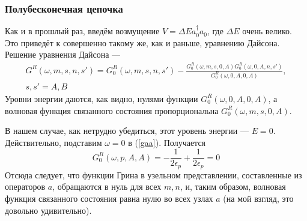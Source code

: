 \subsubsection{Полубесконечная цепочка}
Как и в прошлый раз, введём возмущение $V = \Delta E a_0^\dagger a_0$, где $\Delta E$ очень велико.
Это приведёт к совершенно такому же, как и раньше, уравнению Дайсона. Решение уравнения Дайсона ---
\begin{multline}
	G^R(\omega, m, s, n, s') = 
		G^R_0(\omega, m,s,n,s') - 
		\frac{G^R_0(\omega, m, s, 0, A)G^R_0(\omega, 0, A, n, s')}{G^R_0(\omega, 0, A, 0, A)},\\
		s,s' = A,B
\end{multline}
Уровни энергии даются, как видно, нулями функции $G^R_0(\omega, 0,A,0,A)$, а волновая функция
связанного состояния пропорциональна $G^R_0(\omega, m,s,0,A)$.

В нашем случае, как нетрудно убедиться, этот уровень энергии --- $E = 0$. Действительно, подставим 
$\omega = 0$ в (\ref{gaa}). Получается
\begin{equation}
	G^R_0 (\omega, p, A, A) = 
		-\frac{1}{2\epsilon_p} + 
					\frac{1}{2\epsilon_p} = 0
\end{equation}
Отсюда следует, что функции Грина в узельном представлении, 
составленные из операторов $a$, обращаются в нуль для всех $m,n$, и, таким образом, волновая 
функция связанного состояния равна нулю во всех узлах $a$ (на мой взгляд, это довольно
удивительно).

